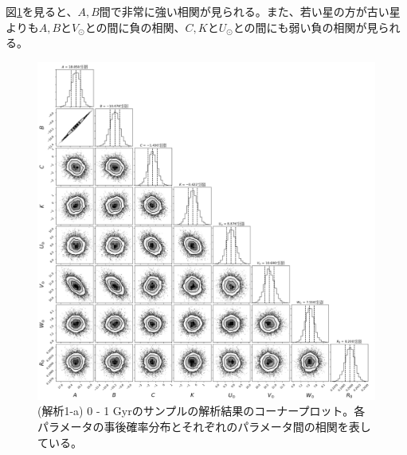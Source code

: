 図\ref{tri1a_0-1}を見ると、$A,B$間で非常に強い相関が見られる。また、若い星の方が古い星よりも$A,B$と$V_{\odot}$との間に負の相関、$C,K$と$U_{\odot}$との間にも弱い負の相関が見られる。

\begin{figure}[htbp]
\begin{center}
	\includegraphics[width=14cm]{fig/1a/trinagle_walker60_Nrun3000_Nburn2000_withscatter_0to1Gyr_1kpc_6076stars_newModel_23.png}
	\caption{(解析1-a) 0 - 1 Gyrのサンプルの解析結果のコーナープロット。各パラメータの事後確率分布とそれぞれのパラメータ間の相関を表している。}
	\label{tri1a_0-1}
\end{center}
\end{figure}


